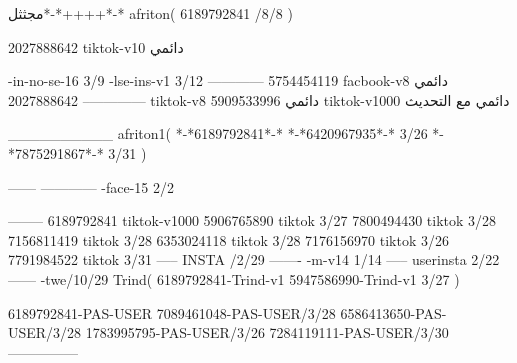 مجثثل*-*++++*-*
afriton(
6189792841 /8/8
)

2027888642 tiktok-v10
دائمي

-in-no-se-16 3/9
-lse-ins-v1 3/12
------------
5754454119 facbook-v8
دائمي
--------------
2027888642 tiktok-v8
دائمي
5909533996 tiktok-v1000
دائمي مع التحديث

__________
afriton1(
*-*6189792841*-*
*-*6420967935*-* 3/26
*-*7875291867*-* 3/31
)


------
------------
-face-15 2/2

--------
6189792841 tiktok-v1000
5906765890 tiktok 3/27
7800494430 tiktok 3/28
7156811419 tiktok 3/28
6353024118 tiktok 3/28
7176156970 tiktok 3/26
7791984522 tiktok 3/31
-----
 INSTA /2/29
-------
-m-v14 1/14
-----
userinsta 2/22
------
-twe/10/29
Trind(
6189792841-Trind-v1 
5947586990-Trind-v1 3/27
)

6189792841-PAS-USER
7089461048-PAS-USER/3/28
6586413650-PAS-USER/3/28
1783995795-PAS-USER/3/26
7284119111-PAS-USER/3/30
    ---------------
